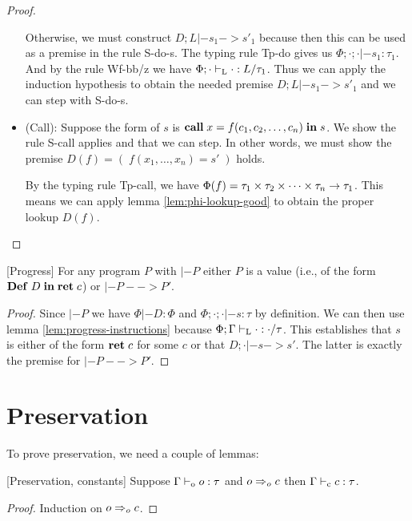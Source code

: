 \documentclass[a4paper, oneside, 10pt, draft]{memoir}
\begin{document}
\begin{proof}
\begin{itemize}
    Otherwise, we must construct $D;L |- s_1 -> s'_1$ because then
    this can be used as a premise in the rule S-do-s. The typing rule
    Tp-do gives us $\Phi;\cdot;\cdot |- s_1 : \tau_1$. And by the rule
    Wf-bb/z we have $\Phi;\cdot |-_{\mathrm{L}} \cdot : L / \tau_1$. Thus we can
    apply the induction hypothesis to obtain the needed premise $D;L
    |- s_1 -> s'_1$ and we can step with S-do-s.
  \item (Call): Suppose the form of $s$ is $\mathbf{call} \; x = f (c_1, c_2,
      \dotsc, c_n)\; \mathbf{in} \; s$. We show the rule S-call applies and that we
    can step. In other words, we must show the premise $D(f) = (\;
    f(x_1, \dotsc, x_n) = s' \;)$ holds.

    By the typing rule Tp-call, we have $\Phi(f) = \tau_1 \times \tau_2 \times \dotsb \times \tau_n -> \tau_1$. This
    means we can apply lemma \ref{lem:phi-lookup-good} to obtain the
    proper lookup $D(f)$.
  \end{itemize}
\end{proof}

\begin{thm}{[Progress]}
  For any program $P$ with $|- P$ either $P$ is a value (i.e., of the
  form $\mathbf{Def} \; D \; \mathbf{in} \; \mathbf{ret} \; c$) or $|- P --> P'$.
\end{thm}
\begin{proof}
  Since $|- P$ we have $\Phi |- D : \Phi$ and $\Phi;\cdot;\cdot |- s :
  \tau$ by definition. We can then use lemma
  \ref{lem:progress-instructions} because $\Phi;\Gamma |-_{\mathrm{L}} \cdot :
  \cdot / \tau$. This establishes that $s$ is either of the form
  $\mathbf{ret} \; c$ for some $c$ or that $D;\cdot |- s -> s'$. The latter is
  exactly the premise for $|- P --> P'$.
\end{proof}

\section{Preservation}

To prove preservation, we need a couple of lemmas:

\begin{lem}{[Preservation, constants]}
  \label{lem:preservation-c}
  Suppose $\Gamma |-_{\mathrm{o}} o : \tau$ and $o =>_{o} c$ then $\Gamma |-_{\mathrm{c}}
  c : \tau$.
\end{lem}
\begin{proof}
  Induction on $o =>_{o} c$.
\end{proof}
\end{document}
